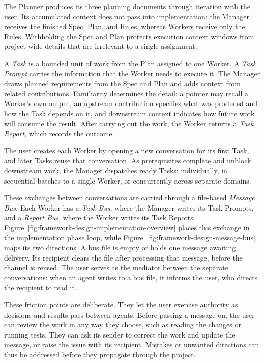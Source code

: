 The Planner produces its three planning documents through iteration with the user. Its accumulated context does not pass into implementation: the Manager receives the finished Spec, Plan, and Rules, whereas Workers receive only the Rules. Withholding the Spec and Plan protects execution context windows from project-wide details that are irrelevant to a single assignment.

A \emph{Task} is a bounded unit of work from the Plan assigned to one Worker. A \emph{Task Prompt} carries the information that the Worker needs to execute it. The Manager draws planned requirements from the Spec and Plan and adds context from related contributions. Familiarity determines the detail: a pointer may recall a Worker's own output, an upstream contribution specifies what was produced and how the Task depends on it, and downstream context indicates how future work will consume the result. After carrying out the work, the Worker returns a \emph{Task Report}, which records the outcome.

The user creates each Worker by opening a new conversation for its first Task, and later Tasks reuse that conversation. As prerequisites complete and unblock downstream work, the Manager dispatches ready Tasks: individually, in sequential batches to a single Worker, or concurrently across separate domains.

These exchanges between conversations are carried through a file-based \emph{Message Bus}. Each Worker has a \emph{Task Bus}, where the Manager writes its Task Prompts, and a \emph{Report Bus}, where the Worker writes its Task Reports. Figure~\ref{fig:framework-design-implementation-overview} places this exchange in the implementation phase loop, while Figure~\ref{fig:framework-design-message-bus} maps its two directions. A bus file is empty or holds one message awaiting delivery. Its recipient clears the file after processing that message, before the channel is reused. The user serves as the mediator between the separate conversations: when an agent writes to a bus file, it informs the user, who directs the recipient to read it.

These friction points are deliberate. They let the user exercise authority as decisions and results pass between agents. Before passing a message on, the user can review the work in any way they choose, such as reading the changes or running tests. They can ask its sender to correct the work and update the message, or raise the issue with its recipient. Mistakes or unwanted directions can thus be addressed before they propagate through the project.

